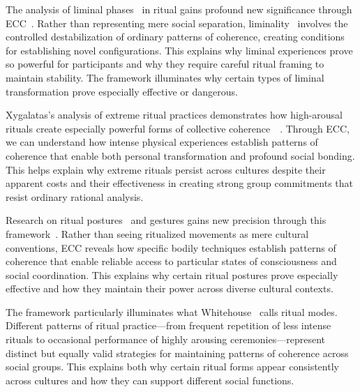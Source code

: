 The analysis of liminal phases~ in ritual gains profound new significance through ECC~\cite{turner1969ritual,kapferer2004ritual}. Rather than representing mere social separation, liminality~ involves the controlled destabilization of ordinary patterns of coherence, creating conditions for establishing novel configurations. This explains why liminal experiences prove so powerful for participants and why they require careful ritual framing to maintain stability. The framework illuminates why certain types of liminal transformation prove especially effective or dangerous.

Xygalatas's analysis of extreme ritual practices demonstrates how high-arousal rituals create especially powerful forms of collective coherence~~\cite{xygalatas2013burning}. Through ECC, we can understand how intense physical experiences establish patterns of coherence that enable both personal transformation and profound social bonding. This helps explain why extreme rituals persist across cultures despite their apparent costs and their effectiveness in creating strong group commitments that resist ordinary rational analysis.

Research on ritual postures~ and gestures gains new precision through this framework~\cite{csordas1994embodiment,jackson1989knowledge}. Rather than seeing ritualized movements as mere cultural conventions, ECC reveals how specific bodily techniques establish patterns of coherence that enable reliable access to particular states of consciousness and social coordination. This explains why certain ritual postures prove especially effective and how they maintain their power across diverse cultural contexts.

The framework particularly illuminates what Whitehouse~\cite{whitehouse2004modes} calls ritual modes. Different patterns of ritual practice—from frequent repetition of less intense rituals to occasional performance of highly arousing ceremonies—represent distinct but equally valid strategies for maintaining patterns of coherence across social groups. This explains both why certain ritual forms appear consistently across cultures and how they can support different social functions.

